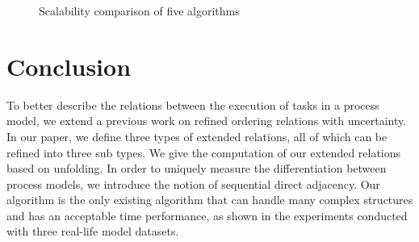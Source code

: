 \documentclass{llncs}
\begin{document}
\begin{figure}[htbp]
\centering
{}
\caption[Scalability comparison of five algorithms]{Scalability comparison of five algorithms\footnotemark\label{fig:scalability}}
\end{figure}

\section{Conclusion}\label{sec:conclusion}
To better describe the relations between the execution of tasks in a process model, we extend a previous work on refined ordering relations with uncertainty. In our paper, we define three types of extended relations, all of which can be refined into three sub types. We give the computation of our extended relations based on unfolding. In order to uniquely measure the differentiation between process models, we introduce the notion of sequential direct adjacency. Our algorithm is the only existing algorithm that can handle many complex structures and has an acceptable time performance, as shown in the experiments conducted with three real-life model datasets.
\end{document}
